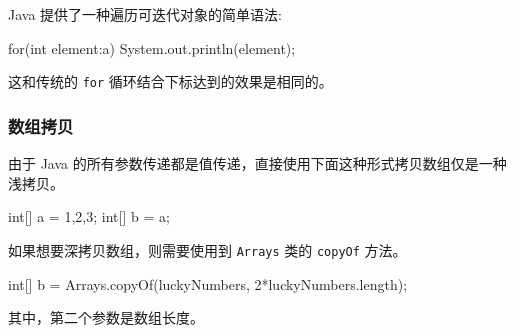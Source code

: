 Java 提供了一种遍历可迭代对象的简单语法:
\begin{Java}
for(int element:a)
    System.out.println(element);
\end{Java}

这和传统的 \texttt{for} 循环结合下标达到的效果是相同的。

\subsubsection{数组拷贝}

由于 Java 的所有参数传递都是值传递，直接使用下面这种形式拷贝数组仅是一种浅拷贝。

\begin{Java}
int[] a = {1,2,3};
int[] b = a;
\end{Java}

如果想要深拷贝数组，则需要使用到 \texttt{Arrays} 类的 \texttt{copyOf} 方法。

\begin{Java}
int[] b = Arrays.copyOf(luckyNumbers, 2*luckyNumbers.length);
\end{Java}

其中，第二个参数是数组长度。

\newpage